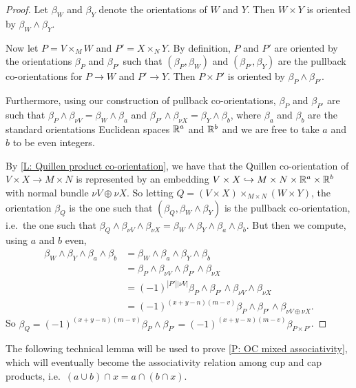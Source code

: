 \begin{proof}
	Let $\beta_W$ and $\beta_Y$ denote the orientations of $W$ and $Y$.
	Then $W \times Y$ is oriented by $\beta_W \wedge \beta_Y$.

	Now let $P = V \times_M W$ and $P' = X \times_N Y$.
	By definition, $P$ and $P'$ are oriented by the orientations $\beta_P$ and $\beta_{P'}$ such that $(\beta_P,\beta_W)$ and $(\beta_{P'},\beta_Y)$ are the pullback co-orientations for $P \to W$ and $P' \to Y$.
	Then $P \times P'$ is oriented by $\beta_P \wedge \beta_{P'}$.

	Furthermore, using our construction of pullback co-orientations, $\beta_P$ and $\beta_{P'}$ are such that $\beta_P \wedge \beta_{\nu V} = \beta_W \wedge \beta_a$ and $\beta_{P'} \wedge \beta_{\nu X} = \beta_Y \wedge \beta_b$, where $\beta_a$ and $\beta_b$ are the standard orientations Euclidean spaces $\mathbb{R}^a$ and $\mathbb{R}^b$ and we are free to take $a$ and $b$ to be even integers.

	By \cref{L: Quillen product co-orientation}, we have that the Quillen co-orientation of $V \times X \to M \times N$ is represented by an embedding $V \times X \hookrightarrow M \times N \times \mathbb{R}^a \times \mathbb{R}^b$ with normal bundle $\nu V \oplus \nu X$.
	So letting $Q = (V \times X)\times_{M \times N} (W \times Y)$, the orientation $\beta_Q$ is the one such that $(\beta_Q,\beta_W \wedge \beta_Y)$ is the pullback co-orientation, i.e.\ the one such that $\beta_Q \wedge \beta_{\nu V} \wedge \beta_{\nu X} = \beta_W \wedge \beta_Y \wedge \beta_a \wedge \beta_b$.
	But then we compute, using $a$ and $b$ even,
	\begin{align*}
		\beta_W \wedge \beta_Y \wedge \beta_a \wedge \beta_b& = \beta_W \wedge \beta_a \wedge \beta_Y \wedge \beta_b\\
		& = \beta_P \wedge \beta_{\nu V} \wedge \beta_{P'} \wedge \beta_{\nu X}\\
		& = (-1)^{|P'||\nu V|}\beta_P \wedge \beta_{P'} \wedge \beta_{\nu V} \wedge \beta_{\nu X}\\
		& = (-1)^{(x+y-n)(m-v)}\beta_P \wedge \beta_{P'} \wedge \beta_{\nu V \oplus \nu X}.
	\end{align*}
	So $\beta_Q = (-1)^{(x+y-n)(m-v)}\beta_P \wedge \beta_{P'} = (-1)^{(x+y-n)(m-v)}\beta_{P \times P'}$.
\end{proof}

The following technical lemma will be used to prove \cref{P: OC mixed associativity}, which will eventually become the associativity relation among cup and cap products, i.e.\ $(a \cup b) \cap x = a \cap (b \cap x)$.


